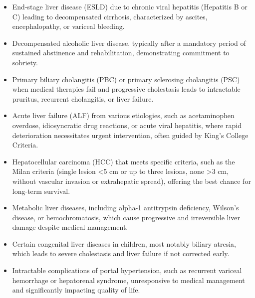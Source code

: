 \begin{itemize}
  \item End-stage liver disease (ESLD) due to chronic viral hepatitis (Hepatitis B or C) leading to decompensated cirrhosis, characterized by ascites, encephalopathy, or variceal bleeding.
  \item Decompensated alcoholic liver disease, typically after a mandatory period of sustained abstinence and rehabilitation, demonstrating commitment to sobriety.
  \item Primary biliary cholangitis (PBC) or primary sclerosing cholangitis (PSC) when medical therapies fail and progressive cholestasis leads to intractable pruritus, recurrent cholangitis, or liver failure.
  \item Acute liver failure (ALF) from various etiologies, such as acetaminophen overdose, idiosyncratic drug reactions, or acute viral hepatitis, where rapid deterioration necessitates urgent intervention, often guided by King's College Criteria.
  \item Hepatocellular carcinoma (HCC) that meets specific criteria, such as the Milan criteria (single lesion \textless 5 cm or up to three lesions, none \textgreater 3 cm, without vascular invasion or extrahepatic spread), offering the best chance for long-term survival.
  \item Metabolic liver diseases, including alpha-1 antitrypsin deficiency, Wilson's disease, or hemochromatosis, which cause progressive and irreversible liver damage despite medical management.
  \item Certain congenital liver diseases in children, most notably biliary atresia, which leads to severe cholestasis and liver failure if not corrected early.
  \item Intractable complications of portal hypertension, such as recurrent variceal hemorrhage or hepatorenal syndrome, unresponsive to medical management and significantly impacting quality of life.
\end{itemize}

